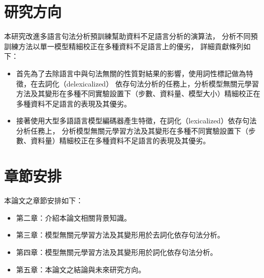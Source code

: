\section{研究方向}
本研究改進多語言句法分析預訓練幫助資料不足語言分析的演算法，
分析不同預訓練方法以單一模型精細校正在多種資料不足語言上的優劣，
詳細貢獻條列如下：
\begin{itemize}
  \item 首先為了去除語言中與句法無關的性質對結果的影響，使用詞性標記做為特徵，在去詞化（delexicalized）
  依存句法分析的任務上，分析模型無關元學習方法及其變形在多種不同實驗設置下（步數、資料量、模型大小）精細校正在多種資料不足語言的表現及其優劣。
  \item 接著使用大型多語語言模型編碼器產生特徵，在詞化（lexicalized）依存句法分析任務上，
分析模型無關元學習方法及其變形在多種不同實驗設置下（步數、資料量）精細校正在多種資料不足語言的表現及其優劣。
\end{itemize}


\section{章節安排}
本論文之章節安排如下：

\begin{itemize}
\itemsep -2pt %
  \item  第二章：介紹本論文相關背景知識。
  \item  第三章：模型無關元學習方法及其變形用於去詞化依存句法分析。
  \item  第四章：模型無關元學習方法及其變形用於詞化依存句法分析。
  \item  第五章：本論文之結論與未來研究方向。
\end{itemize}

